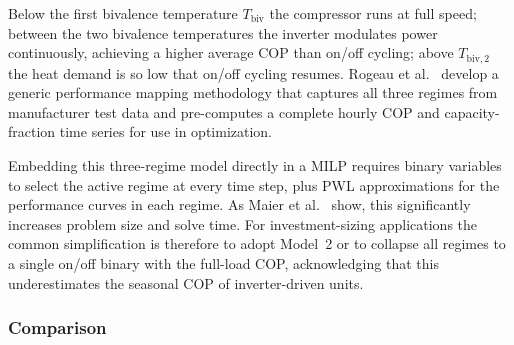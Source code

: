 \documentclass[11pt,a4paper]{report}
\begin{document}
Below the first bivalence temperature $T_{\mathrm{biv}}$ the compressor runs at full speed; between the two bivalence temperatures the inverter modulates power continuously, achieving a higher average COP than on/off cycling; above $T_{\mathrm{biv},2}$ the heat demand is so low that on/off cycling resumes.
Rogeau et al.~\cite{Rogeau2024HPPL} develop a generic performance mapping methodology that captures all three regimes from manufacturer test data and pre-computes a complete hourly COP and capacity-fraction time series for use in optimization.

Embedding this three-regime model directly in a MILP requires binary variables to select the active regime at every time step, plus PWL approximations for the performance curves in each regime.
As Maier et al.~\cite{maier2022mpc} show, this significantly increases problem size and solve time.
For investment-sizing applications the common simplification is therefore to adopt Model~2 or to collapse all regimes to a single on/off binary with the full-load COP, acknowledging that this underestimates the seasonal COP of inverter-driven units.

\subsubsection{Comparison}

\begin{table}[H]
\centering
\caption{Comparison of heat pump part-load modeling approaches.}
\label{tab:hp_partload_comparison}
\end{table}
\end{document}

